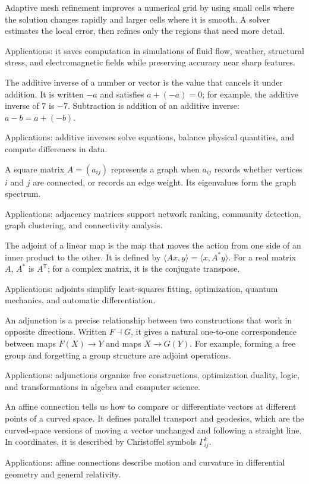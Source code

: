 Adaptive mesh refinement improves a numerical grid by using small cells where the solution changes rapidly and larger cells where it is smooth. A solver estimates the local error, then refines only the regions that need more detail. \par\noindent Applications: it saves computation in simulations of fluid flow, weather, structural stress, and electromagnetic fields while preserving accuracy near sharp features.

The additive inverse of a number or vector is the value that cancels it under addition. It is written $-a$ and satisfies $a+(-a)=0$; for example, the additive inverse of $7$ is $-7$. Subtraction is addition of an additive inverse: $a-b=a+(-b)$. \par\noindent Applications: additive inverses solve equations, balance physical quantities, and compute differences in data.

A square matrix $A=(a_{ij})$ represents a graph when $a_{ij}$ records whether vertices $i$ and $j$ are connected, or records an edge weight. Its eigenvalues form the graph spectrum. \par\noindent Applications: adjacency matrices support network ranking, community detection, graph clustering, and connectivity analysis.

The adjoint of a linear map is the map that moves the action from one side of an inner product to the other. It is defined by $\langle Ax,y\rangle=\langle x,A^*y\rangle$. For a real matrix $A$, $A^*$ is $A^{\mathsf T}$; for a complex matrix, it is the conjugate transpose. \par\noindent Applications: adjoints simplify least-squares fitting, optimization, quantum mechanics, and automatic differentiation.

An adjunction is a precise relationship between two constructions that work in opposite directions. Written $F\dashv G$, it gives a natural one-to-one correspondence between maps $F(X)\to Y$ and maps $X\to G(Y)$. For example, forming a free group and forgetting a group structure are adjoint operations. \par\noindent Applications: adjunctions organize free constructions, optimization duality, logic, and transformations in algebra and computer science.

An affine connection tells us how to compare or differentiate vectors at different points of a curved space. It defines parallel transport and geodesics, which are the curved-space versions of moving a vector unchanged and following a straight line. In coordinates, it is described by Christoffel symbols $\Gamma^k_{ij}$. \par\noindent Applications: affine connections describe motion and curvature in differential geometry and general relativity.


